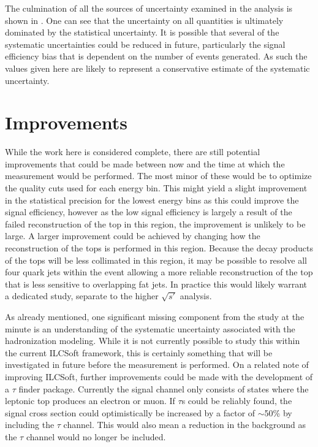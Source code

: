 The culmination of all the sources of uncertainty examined in the analysis is shown in . One can see that the uncertainty on all quantities is ultimately dominated by the statistical uncertainty. It is possible that several of the systematic uncertainties could be reduced in future, particularly the signal efficiency bias that is dependent on the number of events generated. As such the values given here are likely to represent a conservative estimate of the systematic uncertainty.


\section{Improvements}

While the work here is considered complete, there are still potential improvements that could be made between now and the time at which the measurement would be performed. The most minor of these would be to optimize the quality cuts used for each energy bin. This might yield a slight improvement in the statistical precision for the lowest energy bins as this could improve the signal efficiency, however as the low signal efficiency is largely a result of the failed reconstruction of the top in this region, the improvement is unlikely to be large. A larger improvement could be achieved by changing how the reconstruction of the tops is performed in this region. Because the decay products of the tops will be less collimated in this region, it may be possible to resolve all four quark jets within the event allowing a more reliable reconstruction of the top that is less sensitive to overlapping fat jets. In practice this would likely warrant a dedicated study, separate to the higher $\sqrt{s'}$ analysis.

As already mentioned, one significant missing component from the study at the minute is an understanding of the systematic uncertainty associated with the hadronization modeling. While it is not currently possible to study this within the current ILCSoft framework, this is certainly something that will be investigated in future before the measurement is performed. On a related note of improving ILCSoft, further improvements could be made with the development of a $\tau$ finder package. Currently the signal channel only consists of states where the leptonic top produces an electron or muon. If $\tau$s could be reliably found, the signal cross section could optimistically be increased by a factor of $\sim$50\% by including the $\tau$ channel. This would also mean a reduction in the background as the $\tau$ channel would no longer be included. 


